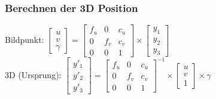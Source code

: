 \documentclass[18pt]{beamer}
\begin{document}
\begin{frame}
	\frametitle{Berechnen der 3D Position} 
Bildpunkt: $\begin{bmatrix}
u \\
v \\
\gamma
\end{bmatrix}
= \begin{bmatrix}
f_u & 0 & c_u  \\
0 & f_v & c_v  \\
0 & 0 & 1  
\end{bmatrix}
\times
\begin{bmatrix}
y_1 \\
y_2 \\
y_3
\end{bmatrix}$\\
\pause
3D (Ursprung): $\begin{bmatrix}
y'_1 \\
y'_2 \\
y'_3
\end{bmatrix}
= \begin{bmatrix}
f_u & 0 & c_u  \\
0 & f_v & c_v  \\
0 & 0 & 1  
\end{bmatrix}^{-1}
\times
\begin{bmatrix}
u \\
v \\
1
\end{bmatrix}
\times
\gamma
$
\end{frame}
\end{document}
